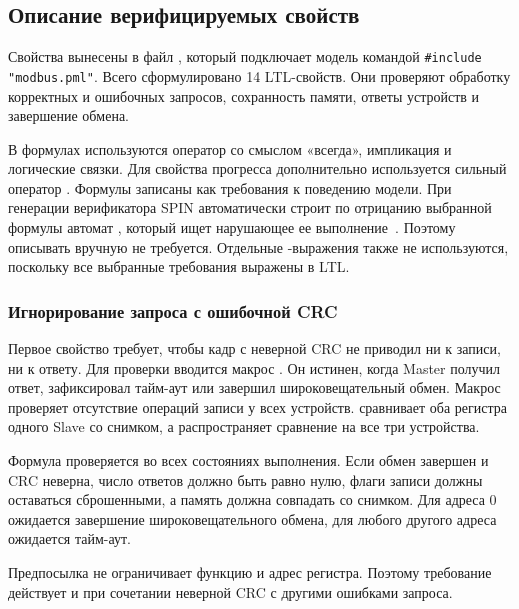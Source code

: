 \subsection{Описание верифицируемых свойств}

Свойства вынесены в файл , который подключает
модель командой \verb|#include "modbus.pml"|. Всего сформулировано
14 LTL-свойств. Они проверяют обработку корректных и ошибочных запросов,
сохранность памяти, ответы устройств и завершение обмена.

В формулах используются оператор \code{[]} со смыслом «всегда»,
импликация \code{->} и логические связки. Для свойства прогресса
дополнительно используется сильный оператор . Формулы записаны
как требования к поведению модели. При генерации верификатора SPIN
автоматически строит по отрицанию выбранной формулы автомат
, который ищет нарушающее ее выполнение~\cite{ltl}.
Поэтому описывать  вручную не требуется. Отдельные
-выражения также не используются, поскольку все выбранные
требования выражены в LTL.

\subsubsection{Игнорирование запроса с ошибочной CRC}

Первое свойство требует, чтобы кадр с неверной CRC не приводил ни к записи,
ни к ответу. Для проверки вводится макрос . Он истинен,
когда Master получил ответ, зафиксировал тайм-аут или завершил
широковещательный обмен. Макрос 
проверяет отсутствие операций записи у всех устройств.
 сравнивает оба регистра одного Slave со снимком,
а  распространяет сравнение на все три устройства.


Формула проверяется во всех состояниях выполнения. Если обмен завершен
и CRC неверна, число ответов должно быть равно нулю, флаги записи должны
оставаться сброшенными, а память должна совпадать со снимком. Для адреса 0
ожидается завершение широковещательного обмена, для любого другого
адреса ожидается тайм-аут.

Предпосылка не ограничивает функцию и адрес регистра. Поэтому требование
действует и при сочетании неверной CRC с другими ошибками запроса.

